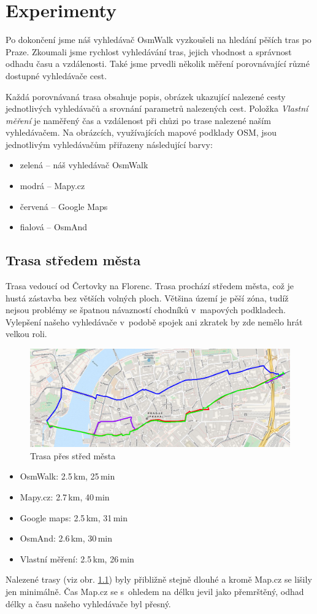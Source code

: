 \chapter{Experimenty}
Po dokončení jsme náš vyhledávač OsmWalk vyzkoušeli na hledání pěších tras po
Praze. Zkoumali jsme rychlost vyhledávání tras, jejich vhodnost a správnost
odhadu času a vzdálenosti. Také jsme prvedli několik měření porovnávající různé
dostupné vyhledávače cest.

Každá porovnávaná trasa obsahuje popis, obrázek ukazující nalezené cesty
jednotlivých vyhledávačů a srovnání parametrů nalezených cest. Položka {\it
Vlastní měření} je naměřený čas a vzdálenost při chůzi po trase nalezené naším
vyhledávačem. Na obrázcích, využívajících mapové podklady OSM, jsou jednotlivým
vyhledávačům přiřazeny následující barvy:
\begin{itemize}
\item zelená -- náš vyhledávač OsmWalk
\item modrá -- Mapy.cz
\item červená -- Google Maps
\item fialová -- OsmAnd
\end{itemize}

\section{Trasa středem města}
Trasa vedoucí od Čertovky na Florenc. Trasa prochází středem města, což je hustá
zástavba bez větších volných ploch. Většina území je pěší zóna, tudíž nejsou
problémy se špatnou návazností chodníků v~mapových podkladech. Vylepšení našeho
vyhledávače v~podobě spojek ani zkratek by zde nemělo hrát velkou roli.
\begin{figure}[h]
	\centering
	\includegraphics[width=13cm]{../img/km-frc.png}
	\caption{Trasa přes střed města}
	\label{fig:km-frc}
\end{figure}
\begin{itemize}
	\item OsmWalk: 2.5\,km, 25\,min
	\item Mapy.cz: 2.7\,km, 40\,min
	\item Google maps: 2.5\,km, 31\,min
	\item OsmAnd: 2.6\,km, 30\,min
	\item Vlastní měření: 2.5\,km, 26\,min
\end{itemize}
Nalezené trasy (viz obr. \ref{fig:km-frc}) byly přibližně stejně dlouhé a kromě Map.cz se lišily jen
minimálně. Čas Map.cz se s~ohledem na délku jevil jako přemrštěný, odhad délky a
času našeho vyhledávače byl přesný. 


